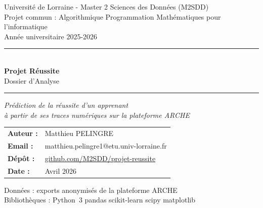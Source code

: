 \documentclass[12pt, a4paper, french]{report}
\begin{document}
\begin{titlepage}
  \centering
  \vspace*{1.5cm}

  {\large\color{pythonblue} Université de Lorraine - Master 2 Sciences des Données (M2SDD)}\\[0.4cm]
  {\normalsize Projet commun : Algorithmique \textperiodcentered{}
    Programmation \textperiodcentered{}
    Mathématiques pour l'informatique}\\[0.3cm]
  {\normalsize Année universitaire 2025-2026}

  \vspace{1.5cm}
  \noindent\rule{\textwidth}{2pt}\\[0.3cm]
  {\Huge\bfseries\color{pythondark} Projet Réussite}\\[0.5cm]
  {\LARGE\color{pythonblue} Dossier d'Analyse}\\[0.3cm]
  \noindent\rule{\textwidth}{2pt}

  \vspace{1.5cm}

  \begin{tcolorbox}[colback=pythonlight, colframe=pythonblue, arc=6pt, boxrule=1.5pt]
    \centering
    \textit{Prédiction de la réussite d'un apprenant\\
    à partir de ses traces numériques sur la plateforme ARCHE}
  \end{tcolorbox}

  \vspace{2cm}

  \begin{tabular}{ll}
    \textbf{Auteur :}  & Matthieu PELINGRE \\
    \textbf{Email :}   & matthieu.pelingre1@etu.univ-lorraine.fr \\
    \textbf{Dépôt :} & \href{https://github.com/M2SDD/projet-reussite}{github.com/M2SDD/projet-reussite} \\
    \textbf{Date :}    & Avril 2026 \\
  \end{tabular}

  \vfill

  {\small\color{gray}
    Données : exports anonymisés de la plateforme ARCHE\\
    Bibliothèques : Python~3 \textperiodcentered{} pandas \textperiodcentered{}
    scikit-learn \textperiodcentered{} scipy \textperiodcentered{} matplotlib
  }
\end{titlepage}
\end{document}
